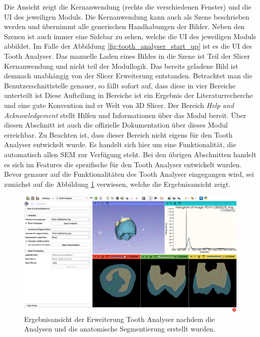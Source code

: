 Die Ansicht zeigt die Kernanwendung (rechts die verschiedenen Fenster) und die
\ac{UI} des jeweiligen Moduls. Die Kernanwendung kann auch als Szene beschrieben
werden und übernimmt alle generischen Handhabungen der Bilder. Neben den Szenen ist
auch immer eine Sidebar zu sehen, welche die \ac{UI} des jeweiligen Moduls abbildet.
Im Falle der Abbildung \ref{fig:tooth_analyser_start_up} ist es die \ac{UI} des Tooth
Analyser. Das manuelle Laden eines Bildes in die Szene ist Teil der Slicer
Kernanwendung und nicht teil der Modullogik. Das bereits geladene Bild ist demnach
unabhängig von der Slicer Erweiterung entstanden. Betrachtet man die
Benutzerschnittstelle genauer, so fällt sofort auf, dass diese in vier Bereiche
unterteilt ist Diese Aufteilung in Bereiche ist ein Ergebnis der
Literaturrecherche und eine gute Konvention ind er Welt von 3D Slicer. Der Bereich
\textit{Help and Acknowledgement} stellt Hilfen und Informationen über das Modul
bereit. Über diesen Abschnitt ist auch die offizielle Dokumentation über dieses Modul
erreichbar. Zu Beachten ist, dass dieser Bereich nicht eigens für den Tooth Analyser
entwickelt wurde. Es handelt sich hier um eine Funktionalität, die automatisch allen
\ac{SEM} zur Verfügung steht. Bei den übrigen Abschnitten handelt es sich im Features
die spezifische für den Tooth Analyser entwickelt wurden. Bevor genauer auf die
Funktionalitäten des Tooth Analyser eingegangen wird, sei zunächst auf die Abbildung
\ref{fig:tooth_analyser_full_view} verwiesen, welche die Ergebnisansicht zeigt.

\begin{figure}[h]
	\centering
	\includegraphics[scale=0.2, width=\textwidth]{img/toothAnalyserFullView.png}
	\caption{Ergebnisansicht der Erweiterung Tooth Analyser nachdem die Analysen
	und die anatomische Segmentierung erstellt wurden.}
	\label{fig:tooth_analyser_full_view}
\end{figure}


